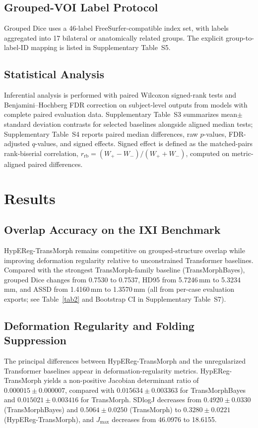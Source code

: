 \documentclass[jimaging,article,submit,pdftex,moreauthors]{Definitions/mdpi}
\begin{document}
\subsection{Grouped-VOI Label Protocol}
Grouped Dice uses a 46-label FreeSurfer-compatible index set, with labels aggregated into 17 bilateral or anatomically related groups. The explicit group-to-label-ID mapping is listed in Supplementary Table~S5.

\subsection{Statistical Analysis}\label{sec:stats}
Inferential analysis is performed with paired Wilcoxon signed-rank tests \cite{wilcoxon1945} and Benjamini--Hochberg FDR correction \cite{bh1995} on subject-level outputs from models with complete paired evaluation data. Supplementary Table~S3 summarizes mean\(\pm\)standard deviation contrasts for selected baselines alongside aligned median tests; Supplementary Table~S4 reports paired median differences, raw \(p\)-values, FDR-adjusted \(q\)-values, and signed effects. Signed effect is defined as the matched-pairs rank-biserial correlation, \(r_{\mathrm{rb}}=(W_+-W_-)/(W_++W_-)\), computed on metric-aligned paired differences.

\section{Results}\label{sec:results}

\subsection{Overlap Accuracy on the IXI Benchmark}
HypEReg-TransMorph remains competitive on grouped-structure overlap while improving deformation regularity relative to unconstrained Transformer baselines. Compared with the strongest TransMorph-family baseline (TransMorphBayes), grouped Dice changes from 0.7530 to 0.7537, HD95 from 5.7246\,mm to 5.3234\,mm, and ASSD from 1.4160\,mm to 1.3570\,mm (all from per-case evaluation exports; see Table~\ref{tab2} and Bootstrap CI in Supplementary Table~S7).

\subsection{Deformation Regularity and Folding Suppression}
The principal differences between HypEReg-TransMorph and the unregularized Transformer baselines appear in deformation-regularity metrics. HypEReg-TransMorph yields a non-positive Jacobian determinant ratio of \(0.000015 \pm 0.000007\), compared with \(0.015634 \pm 0.003363\) for TransMorphBayes and \(0.015021 \pm 0.003416\) for TransMorph. SDlogJ decreases from \(0.4920 \pm 0.0330\) (TransMorphBayes) and \(0.5064 \pm 0.0250\) (TransMorph) to \(0.3280 \pm 0.0221\) (HypEReg-TransMorph), and \(J_{\max}\) decreases from 46.0976 to 18.6155.
\end{document}

